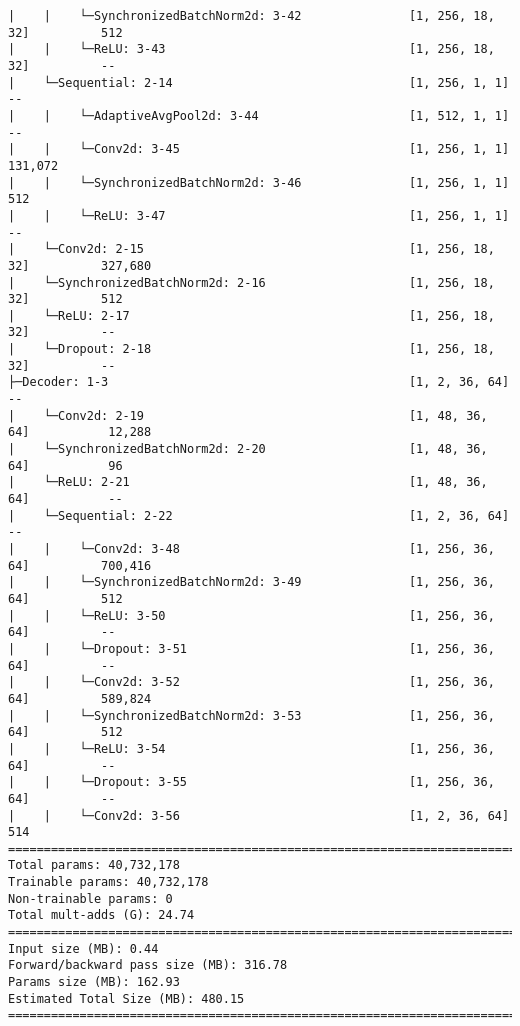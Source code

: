 \begin{verbatim}
|    |    └─SynchronizedBatchNorm2d: 3-42               [1, 256, 18, 32]          512
|    |    └─ReLU: 3-43                                  [1, 256, 18, 32]          --
|    └─Sequential: 2-14                                 [1, 256, 1, 1]            --
|    |    └─AdaptiveAvgPool2d: 3-44                     [1, 512, 1, 1]            --
|    |    └─Conv2d: 3-45                                [1, 256, 1, 1]            131,072
|    |    └─SynchronizedBatchNorm2d: 3-46               [1, 256, 1, 1]            512
|    |    └─ReLU: 3-47                                  [1, 256, 1, 1]            --
|    └─Conv2d: 2-15                                     [1, 256, 18, 32]          327,680
|    └─SynchronizedBatchNorm2d: 2-16                    [1, 256, 18, 32]          512
|    └─ReLU: 2-17                                       [1, 256, 18, 32]          --
|    └─Dropout: 2-18                                    [1, 256, 18, 32]          --
├─Decoder: 1-3                                          [1, 2, 36, 64]            --
|    └─Conv2d: 2-19                                     [1, 48, 36, 64]           12,288
|    └─SynchronizedBatchNorm2d: 2-20                    [1, 48, 36, 64]           96
|    └─ReLU: 2-21                                       [1, 48, 36, 64]           --
|    └─Sequential: 2-22                                 [1, 2, 36, 64]            --
|    |    └─Conv2d: 3-48                                [1, 256, 36, 64]          700,416
|    |    └─SynchronizedBatchNorm2d: 3-49               [1, 256, 36, 64]          512
|    |    └─ReLU: 3-50                                  [1, 256, 36, 64]          --
|    |    └─Dropout: 3-51                               [1, 256, 36, 64]          --
|    |    └─Conv2d: 3-52                                [1, 256, 36, 64]          589,824
|    |    └─SynchronizedBatchNorm2d: 3-53               [1, 256, 36, 64]          512
|    |    └─ReLU: 3-54                                  [1, 256, 36, 64]          --
|    |    └─Dropout: 3-55                               [1, 256, 36, 64]          --
|    |    └─Conv2d: 3-56                                [1, 2, 36, 64]            514
=========================================================================================================
Total params: 40,732,178
Trainable params: 40,732,178
Non-trainable params: 0
Total mult-adds (G): 24.74
=========================================================================================================
Input size (MB): 0.44
Forward/backward pass size (MB): 316.78
Params size (MB): 162.93
Estimated Total Size (MB): 480.15
=========================================================================================================

\end{verbatim}

